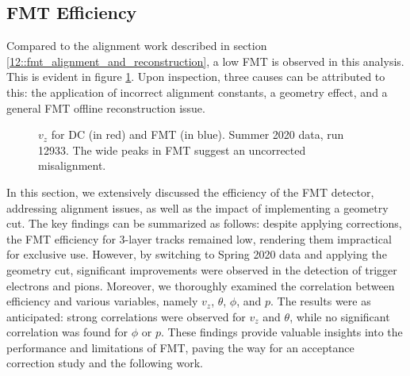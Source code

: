 \subsection{FMT Efficiency}
\label{14.10::fmt_efficiency}
    Compared to the alignment work described in section \ref{12::fmt_alignment_and_reconstruction}, a low FMT is observed in this analysis.
    This is evident in figure \ref{fig::14.10::vz_012933}.
    Upon inspection, three causes can be attributed to this: the application of incorrect alignment constants, a geometry effect, and a general FMT offline reconstruction issue.

    \begin{figure}[b!]
        \centering{}
        \caption[$v_z$ for DC and FMT, run 12933]{$v_z$ for DC (in red) and FMT (in blue). Summer 2020 data, run 12933. The wide peaks in FMT suggest an uncorrected misalignment.}
        \label{fig::14.10::vz_012933}
    \end{figure}

    In this section, we extensively discussed the efficiency of the FMT detector, addressing alignment issues, as well as the impact of implementing a geometry cut.
    The key findings can be summarized as follows: despite applying corrections, the FMT efficiency for 3-layer tracks remained low, rendering them impractical for exclusive use.
    However, by switching to Spring 2020 data and applying the geometry cut, significant improvements were observed in the detection of trigger electrons and pions.
    Moreover, we thoroughly examined the correlation between efficiency and various variables, namely $v_z$, $\theta$, $\phi$, and $p$.
    The results were as anticipated: strong correlations were observed for $v_z$ and $\theta$, while no significant correlation was found for $\phi$ or $p$.
    These findings provide valuable insights into the performance and limitations of FMT, paving the way for an acceptance correction study and the following work.

    
    
    
    
